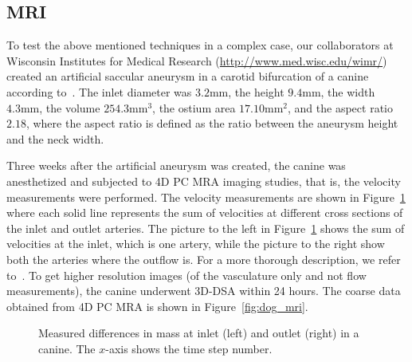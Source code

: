 \subsection{MRI}

To test the above mentioned techniques in a complex case, our
collaborators at Wisconsin Institutes for Medical Research
(\url{http://www.med.wisc.edu/wimr/}) created an artificial saccular
aneurysm in a carotid bifurcation of a canine according
to~\cite{german}. The inlet diameter was $3.2 \mathrm{mm}$, the height
$9.4 \mathrm{mm}$, the width $4.3 \mathrm{mm}$, the volume $254.3
\mathrm{mm}^3$, the ostium area $17.10 \mathrm{mm}^2$, and the aspect
ratio $2.18$, where the aspect ratio is defined as the ratio between
the aneurysm height and the neck width.

Three weeks after the artificial aneurysm was created, the canine was
anesthetized and subjected to 4D PC MRA imaging studies, that is, the
velocity measurements were performed. The velocity measurements are
shown in Figure~\ref{fig:mass_dog} where each solid line represents
the sum of velocities at different cross sections of the inlet and
outlet arteries. The picture to the left in Figure~\ref{fig:mass_dog}
shows the sum of velocities at the inlet, which is one artery, while
the picture to the right show both the arteries where the outflow
is. For a more thorough description, we refer to~\cite{doggy}. To get
higher resolution images (of the vasculature only and not flow
measurements), the canine underwent 3D-DSA within 24 hours. The coarse
data obtained from 4D PC MRA is shown in Figure~\ref{fig:dog_mri}.

\begin{figure}
  \begin{center}
  \end{center}
  \caption{Measured differences in mass at inlet (left) and outlet
    (right) in a canine. The $x$-axis shows the time step number.}
  \label{fig:mass_dog}
\end{figure}

